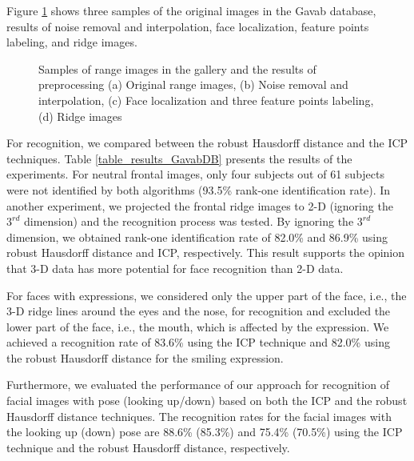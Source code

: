 Figure \ref{fig_sample_preprocessing} shows three samples of the
original images in the Gavab database, results of noise removal and
interpolation, face localization, feature points labeling, and ridge
images.

\begin{figure}[tbp]
\begin{center}
 \caption{Samples of range images in the gallery and the
results of preprocessing (a) Original range images, (b) Noise
removal and interpolation, (c) Face localization and three feature
points labeling, (d) Ridge images} \label{fig_sample_preprocessing}
\end{center}
\end{figure}
For recognition, we compared between the robust Hausdorff distance
and the ICP techniques. Table \ref{table_results_GavabDB} presents
the results of the experiments. For neutral frontal images, only
four subjects out of 61 subjects were not identified by both
algorithms (93.5\% rank-one identification rate). In another
experiment, we projected the frontal ridge images to 2-D (ignoring
the $3^{rd}$ dimension) and the recognition process was tested. By
ignoring the $3^{rd}$ dimension, we obtained rank-one identification
rate of 82.0\% and 86.9\% using robust Hausdorff distance and ICP,
respectively. This result supports the opinion that 3-D data has
more potential for face recognition than 2-D data.

For faces with expressions, we considered only the upper part of the
face, i.e., the 3-D ridge lines around the eyes and the nose, for
recognition and excluded the lower part of the face, i.e., the
mouth, which is affected by the expression. We achieved a
recognition rate of 83.6\% using the ICP technique and 82.0\% using
the robust Hausdorff distance for the smiling expression.

Furthermore, we evaluated the performance of our approach for
recognition of facial images with pose (looking up/down) based on
both the ICP and the robust Hausdorff distance techniques. The
recognition rates for the facial images with the looking up (down)
pose are 88.6\% (85.3\%) and 75.4\% (70.5\%) using the ICP technique
and the robust Hausdorff distance, respectively.

